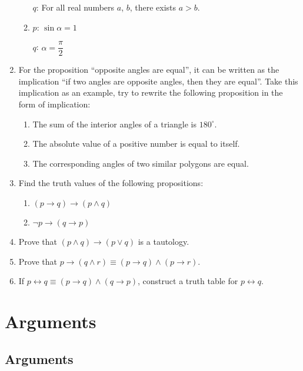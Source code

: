 \documentclass{report}
\newcounter{example}
\begin{document}
\begin{enumerate}[leftmargin=*]
\begin{enumerate}[label=(\alph*), leftmargin=*]
                    $q$: For all real numbers $a$, $b$, there exists $a > b$.

              \item $p$: $\sin\alpha{} = 1$

                    $q$: $\alpha{} = \dfrac{\pi}{2}$
          \end{enumerate}

    \item For the proposition ``opposite angles are equal'', it can be written as the
          implication ``if two angles are opposite angles, then they are equal''. Take
          this implication as an example, try to rewrite the following proposition in the
          form of implication:
          \begin{enumerate}[label=(\alph*), leftmargin=*]
              \item The sum of the interior angles of a triangle is $180^\circ$.
              \item The absolute value of a positive number is equal to itself.
              \item The corresponding angles of two similar polygons are equal.
          \end{enumerate}

    \item Find the truth values of the following propositions:
          \begin{enumerate}[label=(\alph*), leftmargin=*]
              \item $(p \rightarrow q) \rightarrow (p \land q)$
              \item $\neg p \rightarrow (q \rightarrow p)$
          \end{enumerate}

    \item Prove that $(p \land q) \rightarrow (p \lor q)$ is a tautology.
    \item Prove that $p \rightarrow (q \land r) \equiv (p \rightarrow q) \land (p
              \rightarrow r)$.
    \item If $p \leftrightarrow q \equiv (p \rightarrow q) \land (q \rightarrow p)$,
          construct a truth table for $p \leftrightarrow q$.
\end{enumerate}

\section{Arguments}

\subsection*{Arguments}
\end{document}
